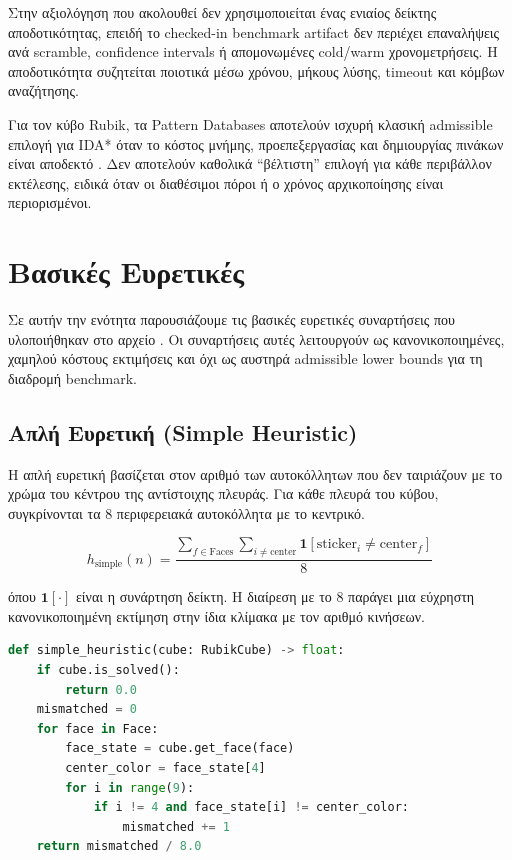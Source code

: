 Στην αξιολόγηση που ακολουθεί δεν χρησιμοποιείται ένας ενιαίος δείκτης
αποδοτικότητας, επειδή το checked-in benchmark artifact δεν περιέχει επαναλήψεις
ανά scramble, confidence intervals ή απομονωμένες cold/warm χρονομετρήσεις.
Η αποδοτικότητα συζητείται ποιοτικά μέσω χρόνου, μήκους λύσης, timeout και
κόμβων αναζήτησης.

Για τον κύβο Rubik, τα Pattern Databases αποτελούν ισχυρή κλασική admissible επιλογή για IDA* όταν το κόστος μνήμης, προεπεξεργασίας και δημιουργίας πινάκων είναι αποδεκτό \cite{korf1997finding}. Δεν αποτελούν καθολικά ``βέλτιστη'' επιλογή για κάθε περιβάλλον εκτέλεσης, ειδικά όταν οι διαθέσιμοι πόροι ή ο χρόνος αρχικοποίησης είναι περιορισμένοι.

\section{Βασικές Ευρετικές}
\label{sec:basic-heuristics}

Σε αυτήν την ενότητα παρουσιάζουμε τις βασικές ευρετικές συναρτήσεις που
υλοποιήθηκαν στο αρχείο . Οι συναρτήσεις αυτές
λειτουργούν ως κανονικοποιημένες, χαμηλού κόστους εκτιμήσεις και όχι ως
αυστηρά admissible lower bounds για τη διαδρομή benchmark.

\subsection{Απλή Ευρετική (Simple Heuristic)}
\label{subsec:simple-heuristic}

Η απλή ευρετική βασίζεται στον αριθμό των αυτοκόλλητων που δεν ταιριάζουν με το χρώμα του κέντρου της αντίστοιχης πλευράς. Για κάθε πλευρά του κύβου, συγκρίνονται τα 8 περιφερειακά αυτοκόλλητα με το κεντρικό.

\begin{equation}
\label{eq:simple-heuristic}
h_{\text{simple}}(n) = \frac{\sum_{f \in \text{Faces}} \sum_{i \neq \text{center}} \mathbf{1}[\text{sticker}_i \neq \text{center}_f]}{8}
\end{equation}

\noindent όπου $\mathbf{1}[\cdot]$ είναι η συνάρτηση δείκτη. Η διαίρεση με το 8
παράγει μια εύχρηστη κανονικοποιημένη εκτίμηση στην ίδια κλίμακα με τον αριθμό
κινήσεων.

\begin{lstlisting}[language=Python, caption={Υλοποίηση απλής ευρετικής (src/korf/heuristics.py:28-59)}]
def simple_heuristic(cube: RubikCube) -> float:
    if cube.is_solved():
        return 0.0
    mismatched = 0
    for face in Face:
        face_state = cube.get_face(face)
        center_color = face_state[4]
        for i in range(9):
            if i != 4 and face_state[i] != center_color:
                mismatched += 1
    return mismatched / 8.0
\end{lstlisting}

